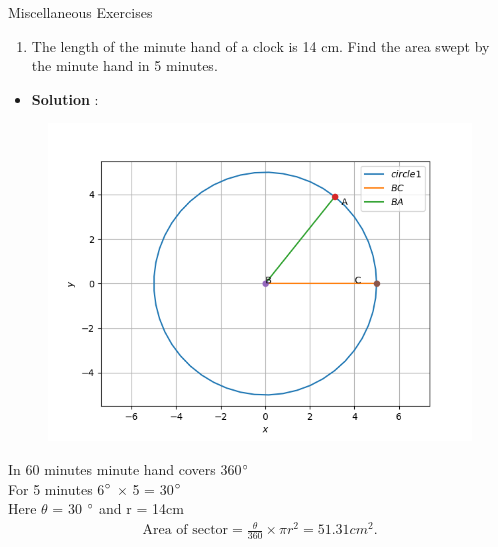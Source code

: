 \begin{frame}{Miscellaneous Exercises}
\begin{enumerate}
\conti
\item The length of the
minute hand of a clock is 14 cm. Find the area
swept by the minute hand in 5 minutes.\\
\seti
\end{enumerate}
\begin{itemize}
\item \textbf{Solution} :
\begin{figure}[!ht]
\resizebox{0.2\linewidth}{!}
{

}
\end{figure}


\end{itemize}
\end{frame}
\begin{frame}
\begin{figure}
\includegraphics[scale=.6]{./CODES/misc.png}
\end{figure}
\end{frame}
\begin{frame}

 In 60 minutes minute hand covers  360$\degree$\\
For 5 minutes 6$\degree$ $\times$ 5 = 30$\degree$\\ 
Here $\theta$ = 30 $\degree$ and r = 14cm\\

\begin{align*}
	\text{Area of sector} = \frac{\theta}{360} \times \pi r^2
	=51.31cm^2.
\end{align*}               
\end{frame}